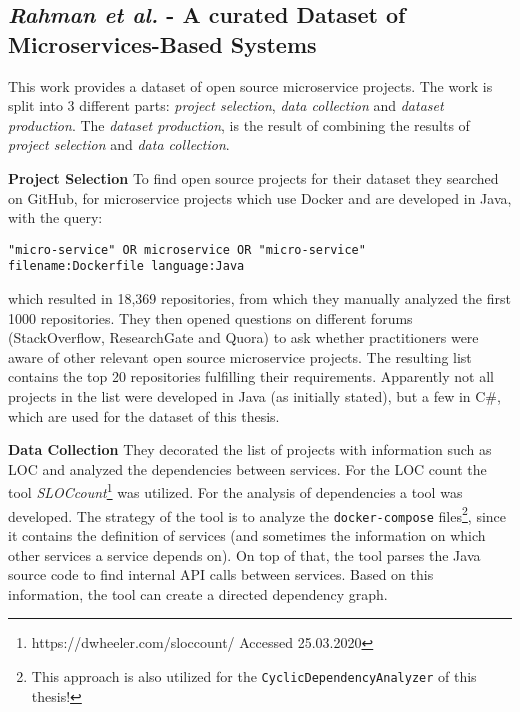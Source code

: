 \documentclass{article}
\begin{document}
\subsection{\textit{Rahman et al.} - A curated Dataset of Microservices-Based Systems}
This work \cite{imranur_curated_2019} provides a dataset of open source microservice projects. The work is split into 3 different parts: \textit{project selection}, \textit{data collection} and \textit{dataset production}. The \textit{dataset production}, is the result of combining the results of \textit{project selection} and \textit{data collection}. \newline

\noindent\textbf{Project Selection}\newline
To find open source projects for their dataset they searched on GitHub, for microservice projects which use Docker and are developed in Java, with the query:
\begin{lstlisting}
"micro-service" OR microservice OR "micro-service"
filename:Dockerfile language:Java
\end{lstlisting}
\noindent which resulted in 18,369 repositories, from which they manually analyzed the first 1000 repositories. They then opened questions on different forums (StackOverflow, ResearchGate and Quora) to ask whether practitioners were aware of other relevant open source microservice projects. The resulting list contains the top 20 repositories fulfilling their requirements. Apparently not all projects in the list were developed in Java (as initially stated), but a few in C\#, which are used for the dataset of this thesis. \newline

\noindent\textbf{Data Collection}\newline
They decorated the list of projects with information such as LOC and analyzed the dependencies between services. For the LOC count the tool \textit{SLOCcount}\footnote{https://dwheeler.com/sloccount/ Accessed 25.03.2020} was utilized. For the analysis of dependencies a tool was developed. The strategy of the tool is to analyze the \lstinline{docker-compose} files\footnote{This approach is also utilized for the \lstinline{CyclicDependencyAnalyzer} of this thesis!}, since it contains the definition of services (and sometimes the information on which other services a service depends on). On top of that, the tool parses the Java source code to find internal API calls between services. Based on this information, the tool can create a directed dependency graph.
\end{document}
